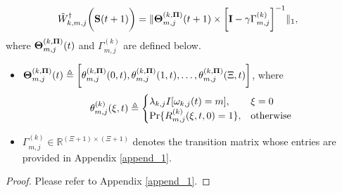 \begin{lemma}
    \label{lemma:w_ap}
    \begin{align}
        &\tilde{W}^{\dagger}_{k,m,j}\bigg(\mathbf{S}(t+1)\bigg) =
        \lVert
            \boldsymbol{\Theta}^{(k, \boldsymbol{\Pi})}_{m,j}(t+1) \times
            \bigg[
                \mathbf{I} - \gamma \Gamma^{(k)}_{m,j}
            \bigg]^{-1}
        \|_1,
        \label{w_ap}
    \end{align}
    where $\boldsymbol{\Theta}^{(k, \boldsymbol{\Pi})}_{m,j}(t)$ and $\Gamma^{(k)}_{m,j}$ are defined below.
    \begin{itemize}
        \item {$\boldsymbol{\Theta}^{(k,\boldsymbol{\Pi})}_{m,j}(t) \triangleq \bigg[
            \theta^{(k,\boldsymbol{\Pi})}_{m,j}(0,t),
            \theta^{(k,\boldsymbol{\Pi})}_{m,j}(1,t),
            \dots,
            \theta^{(k,\boldsymbol{\Pi})}_{m,j}(\Xi,t)
            \bigg]$},
        where 
        \begin{align}
            \theta^{(k)}_{m,j}(\xi,t) \triangleq 
            \begin{cases}
                \lambda_{k,j} I[\omega_{k,j}(t)=m], & \xi=0
                \\
                \Pr\{R^{(k)}_{m,j}(\xi,t,0) = 1\}, & \text{otherwise}
            \end{cases}
        \end{align}
        \item $\Gamma^{(k)}_{m,j} \in \mathbb{R}^{(\Xi+1)\times(\Xi+1)}$ denotes the transition matrix whose entries are provided in Appendix \ref{append_1}.
    \end{itemize}
\end{lemma}
\begin{proof}
    Please refer to Appendix \ref{append_1}.
\end{proof}

